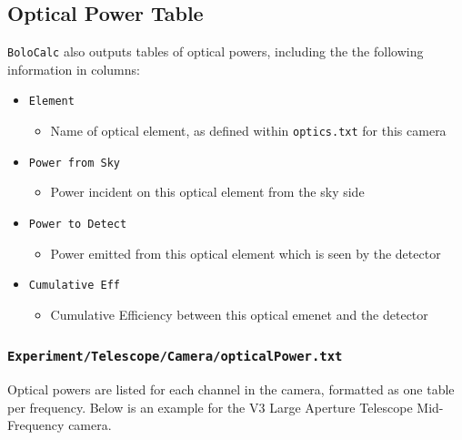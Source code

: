 \documentclass[11pt]{article} %
\begin{document}

\subsection{Optical Power Table}

\texttt{BoloCalc} also outputs tables of optical powers, including the the following information in columns:

\begin{itemize}[noitemsep,topsep=0pt]
	\item \texttt{Element}
		\begin{itemize}[noitemsep,topsep=0pt]
		\item Name of optical element, as defined within \texttt{optics.txt} for this camera
		\end{itemize}
	\item \texttt{Power from Sky}
		\begin{itemize}[noitemsep,topsep=0pt]
		\item Power incident on this optical element from the sky side
		\end{itemize}
	\item \texttt{Power to Detect}
		\begin{itemize}[noitemsep,topsep=0pt]
		\item Power emitted from this optical element which is seen by the detector
		\end{itemize}
	\item \texttt{Cumulative Eff}
		\begin{itemize}[noitemsep,topsep=0pt]
		\item Cumulative Efficiency between this optical emenet and the detector
		\end{itemize}
\end{itemize}


\subsubsection{\texttt{Experiment/Telescope/Camera/opticalPower.txt}}

Optical powers are listed for each channel in the camera, formatted as one table per frequency. Below is an example for the V3 Large Aperture Telescope Mid-Frequency camera.
\end{document}
